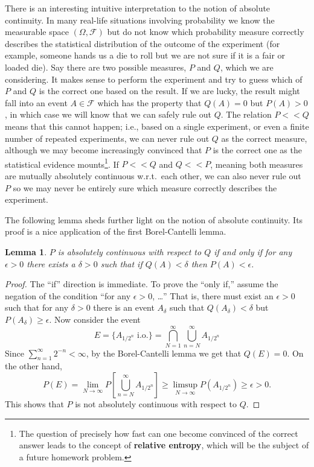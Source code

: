 \documentclass[12pt]{article}
\newtheorem{lem}[thm]{Lemma}
\theoremstyle{example}
\begin{document}
There is an interesting intuitive interpretation to the notion of absolute continuity. In many real-life situations involving probability we know the measurable space $(\Omega, \mathcal{F})$ but do not know which probability measure correctly describes the statistical distribution of the outcome of the experiment (for example, someone hands us a die to roll but we are not sure if it is a fair or loaded die). Say there are two possible measures, $P$ and $Q$, which we are considering. It makes sense to perform the experiment and try to guess which of $P$ and $Q$ is the correct one based on the result. If we are lucky, the result might fall into an event $A \in \mathcal{F}$ which has the property that $Q(A)=0$ but $P(A)>0$, in which case we will know that we can safely rule out $Q$. The relation $P<<Q$ means that this cannot happen; i.e., based on a single experiment, or even a finite number of repeated experiments, we can never rule out $Q$ as the correct measure, although we may become increasingly convinced that $P$ is the correct one as the statistical evidence mounts\footnote{The question of precisely how fast can one become convinced of the correct answer leads to the concept of \textbf{relative entropy}, which will be the subject of a future homework problem.}. If $P<<Q$ and $Q<<P$, meaning both measures are mutually absolutely continuous w.r.t.\ each other, we can also never rule out $P$ so we may never be entirely sure which measure correctly describes the experiment.

The following lemma sheds further light on the notion of absolute continuity. Its proof is a nice application of the first Borel-Cantelli lemma.

\begin{lem} \label{lem-abs-cont}
$P$ is absolutely continuous with respect to $Q$ if and only if for any $\epsilon>0$ there exists a $\delta>0$ such that if $Q(A)<\delta$ then $P(A)<\epsilon$.
\end{lem}

\begin{proof}
The ``if'' direction is immediate. To prove the ``only if,'' assume the negation of the condition ``for any $\epsilon>0$,  \ldots'' That is, there must exist an $\epsilon>0$ such that for any $\delta>0$ there is an event $A_\delta$ such that $Q(A_\delta)< \delta$ but $P(A_\delta)\ge\epsilon$. Now consider the event
$$ E= \{ A_{1/{2^n}}\textrm{ i.o.} \} =  \bigcap_{N=1}^\infty \bigcup_{n=N}^\infty A_{1/2^n}
$$
Since $\sum_{n=1}^\infty 2^{-n}<\infty$, by the Borel-Cantelli lemma we get that $Q(E)=0$. On the other hand,
$$ P(E) = \lim_{N\to\infty} P\left[\bigcup_{n=N}^\infty A_{1/2^n}\right] \ge \limsup_{N\to\infty} P(A_{1/2^n}) \ge \epsilon>0.
$$
This shows that $P$ is not absolutely continuous with respect to $Q$.
\end{proof}
\end{document}
